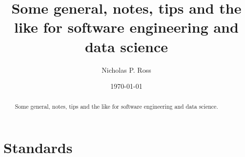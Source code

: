 \documentclass[11pt]{article}
\begin{document}
\title{Some general, notes, tips and the like for software 
engineering and data science}
\author{Nicholas P. Ross}
\date{\today}
\maketitle


\begin{abstract}
Some general, notes, tips and the like for software 
engineering and data science. 
\end{abstract}



\newpage
\section{Standards}
\end{document}
